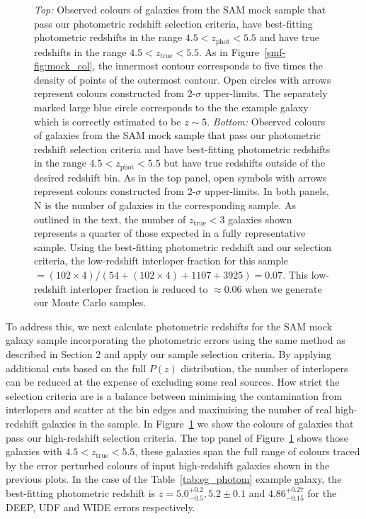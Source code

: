 \begin{figure}
\caption[Observed colours of galaxies from the SAM mock sample that pass our photometric redshift selection criteria.]{\emph{Top:} Observed colours of galaxies from the SAM mock sample that pass our photometric redshift selection criteria, have best-fitting photometric redshifts in the range $4.5 < z_{\text{phot}} < 5.5$ and have true redshifts in the range $4.5 < z_{\text{true}} < 5.5$. As in Figure~\ref{smf-fig:mock_col}, the innermost contour corresponds to five times the density of points of the outermost contour. Open circles with arrows represent colours constructed from 2-$\sigma$ upper-limits. The separately marked large blue circle corresponds to the the example galaxy which is correctly estimated to be $z \sim 5$. \emph{Bottom:} Observed colours of galaxies from the SAM mock sample that pass our photometric redshift selection criteria and have best-fitting photometric redshifts in the range $4.5 < z_{\text{phot}} < 5.5$ but have true redshifts outside of the desired redshift bin. As in the top panel, open symbols with arrows represent colours constructed from 2-$\sigma$ upper-limits. In both panels, N is the number of galaxies in the corresponding sample. As outlined in the text, the number of $z_{\text{true}} < 3$ galaxies shown represents a quarter of those expected in a fully representative sample. Using the best-fitting photometric redshift and our selection criteria, the low-redshift interloper fraction for this sample $= (102 \times 4) / (54 + (102 \times 4) + 1107 + 3925) = 0.07$. This low-redshift interloper fraction is reduced to $\approx 0.06$ when we generate our Monte Carlo samples.}
\label{smf-fig:mock_col_photz}
\end{figure}

To address this, we next calculate photometric redshifts for the SAM mock galaxy sample incorporating the photometric errors using the same method as described in Section 2 and apply our sample selection criteria. By applying additional cuts based on the full $P(z)$ distribution, the number of interlopers can be reduced at the expense of excluding some real sources.  How strict the selection criteria are is a balance between minimising the contamination from interlopers and scatter at the bin edges and maximising the number of real high-redshift galaxies in the sample. In Figure~\ref{smf-fig:mock_col_photz} we show the colours of galaxies that pass our high-redshift selection criteria. The top panel of Figure~\ref{smf-fig:mock_col_photz} shows those galaxies with $4.5 < z_{\text{true}} < 5.5$, these galaxies span the full range of colours traced by the error perturbed colours of input high-redshift galaxies shown in the previous plots. In the case of the Table~\ref{tab:eg_photom} example galaxy, the best-fitting photometric redshift is $z = 5.0^{+0.2}_{-0.5}, 5.2\pm0.1$ and $4.86^{+0.27}_{-0.15}$ for the DEEP, UDF and WIDE errors respectively. 

